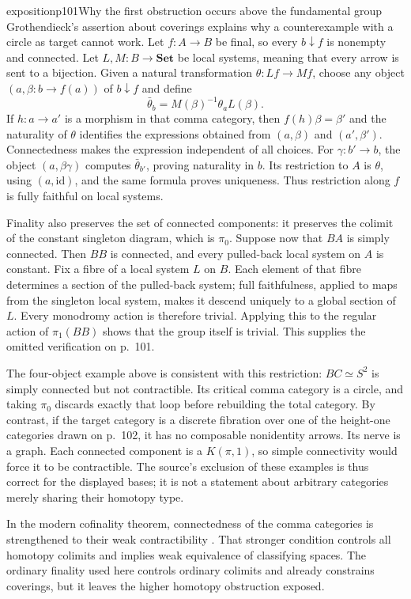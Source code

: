 \begin{dcomment}{exposition}{p101}{Why the first obstruction occurs above the fundamental group}
Grothendieck's assertion about coverings explains why a counterexample with a circle as target cannot work. Let $f:A\to B$ be final, so every $b\downarrow f$ is nonempty and connected. Let $L,M:B\to\mathbf{Set}$ be local systems, meaning that every arrow is sent to a bijection. Given a natural transformation $\theta:Lf\to Mf$, choose any object $(a,\beta:b\to f(a))$ of $b\downarrow f$ and define
\[
\bar\theta_b=M(\beta)^{-1}\theta_a L(\beta).
\]
If $h:a\to a'$ is a morphism in that comma category, then $f(h)\beta=\beta'$ and the naturality of $\theta$ identifies the expressions obtained from $(a,\beta)$ and $(a',\beta')$. Connectedness makes the expression independent of all choices. For $\gamma:b'\to b$, the object $(a,\beta\gamma)$ computes $\bar\theta_{b'}$, proving naturality in $b$. Its restriction to $A$ is $\theta$, using $(a,\mathrm{id})$, and the same formula proves uniqueness. Thus restriction along $f$ is fully faithful on local systems.

Finality also preserves the set of connected components: it preserves the colimit of the constant singleton diagram, which is $\pi_0$. Suppose now that $BA$ is simply connected. Then $BB$ is connected, and every pulled-back local system on $A$ is constant. Fix a fibre of a local system $L$ on $B$. Each element of that fibre determines a section of the pulled-back system; full faithfulness, applied to maps from the singleton local system, makes it descend uniquely to a global section of $L$. Every monodromy action is therefore trivial. Applying this to the regular action of $\pi_1(BB)$ shows that the group itself is trivial. This supplies the omitted verification on p.~101.

The four-object example above is consistent with this restriction: $BC\simeq S^2$ is simply connected but not contractible. Its critical comma category is a circle, and taking $\pi_0$ discards exactly that loop before rebuilding the total category. By contrast, if the target category is a discrete fibration over one of the height-one categories drawn on p.~102, it has no composable nonidentity arrows. Its nerve is a graph. Each connected component is a $K(\pi,1)$, so simple connectivity would force it to be contractible. The source's exclusion of these examples is thus correct for the displayed bases; it is not a statement about arbitrary categories merely sharing their homotopy type.

In the modern cofinality theorem, connectedness of the comma categories is strengthened to their weak contractibility \citep[Theorem~4.1.3.1]{Lurie2009HTT}. That stronger condition controls all homotopy colimits and implies weak equivalence of classifying spaces. The ordinary finality used here controls ordinary colimits and already constrains coverings, but it leaves the higher homotopy obstruction exposed.
\end{dcomment}

